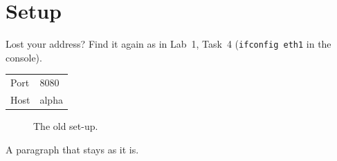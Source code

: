 \documentclass{article}
\newcommand{\code}[1]{\texttt{#1}}
\begin{document}
\section{Setup}
Lost your address? Find it again as in Lab~1, Task~4
(\code{ifconfig eth1} in the console).

\begin{tabular}{ll}
Port & 8080 \\
Host & alpha \\
\end{tabular}

\begin{figure}[h]
\centering
{}
\caption{The old set-up.}
\end{figure}

A paragraph that stays as it is.
\end{document}
